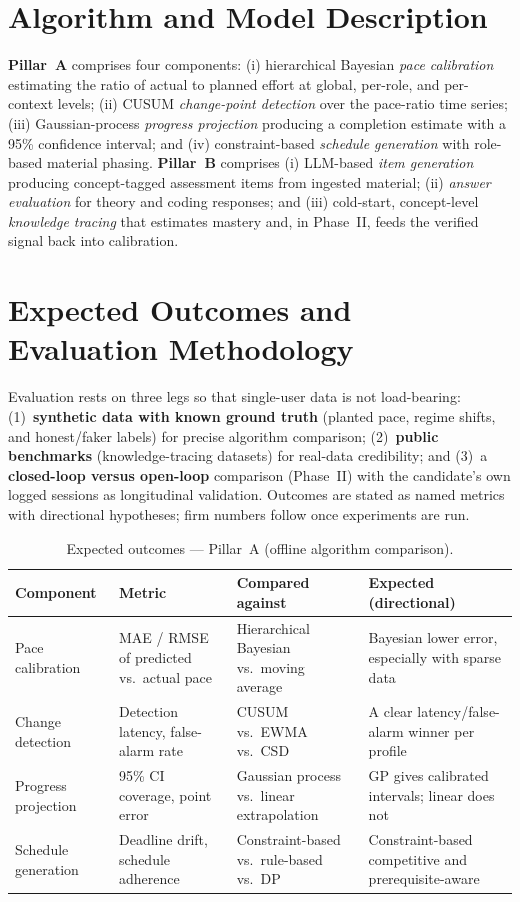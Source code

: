 \documentclass[12pt]{report}
\begin{document}
\section{Algorithm and Model Description}
\textbf{Pillar~A} comprises four components: (i) hierarchical Bayesian \emph{pace
calibration} estimating the ratio of actual to planned effort at global, per-role, and
per-context levels; (ii) CUSUM \emph{change-point detection} over the pace-ratio time
series; (iii) Gaussian-process \emph{progress projection} producing a completion estimate
with a 95\% confidence interval; and (iv) constraint-based \emph{schedule generation} with
role-based material phasing. \textbf{Pillar~B} comprises (i) LLM-based \emph{item
generation} producing concept-tagged assessment items from ingested material;
(ii) \emph{answer evaluation} for theory and coding responses; and (iii) cold-start,
concept-level \emph{knowledge tracing} that estimates mastery and, in Phase~II, feeds the
verified signal back into calibration.

\section{Expected Outcomes and Evaluation Methodology}
Evaluation rests on three legs so that single-user data is not load-bearing:
(1)~\textbf{synthetic data with known ground truth} (planted pace, regime shifts, and
honest/faker labels) for precise algorithm comparison; (2)~\textbf{public benchmarks}
(knowledge-tracing datasets) for real-data credibility; and (3)~a \textbf{closed-loop
versus open-loop} comparison (Phase~II) with the candidate's own logged sessions as
longitudinal validation. Outcomes are stated as named metrics with directional
hypotheses; firm numbers follow once experiments are run.

\begin{table}[htbp]
\centering
\footnotesize
\caption{Expected outcomes --- Pillar~A (offline algorithm comparison).}
\label{tab:outcomes-a}
\begin{tabular}{p{2.3cm} p{3.1cm} p{3.0cm} p{4.0cm}}
\toprule
\textbf{Component} & \textbf{Metric} & \textbf{Compared against} & \textbf{Expected (directional)} \\
\midrule
Pace calibration & MAE / RMSE of predicted vs.\ actual pace & Hierarchical Bayesian vs.\ moving average & Bayesian lower error, especially with sparse data \\
Change detection & Detection latency, false-alarm rate & CUSUM vs.\ EWMA vs.\ CSD & A clear latency/false-alarm winner per profile \\
Progress projection & 95\% CI coverage, point error & Gaussian process vs.\ linear extrapolation & GP gives calibrated intervals; linear does not \\
Schedule generation & Deadline drift, schedule adherence & Constraint-based vs.\ rule-based vs.\ DP & Constraint-based competitive and prerequisite-aware \\
\bottomrule
\end{tabular}
\end{table}
\end{document}
